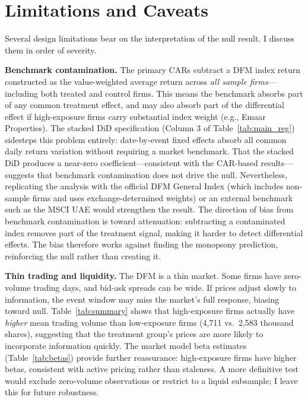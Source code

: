 \documentclass[12pt]{article}
\begin{document}

\section{Limitations and Caveats}\label{sec:limitations}

Several design limitations bear on the interpretation of the null result. I discuss them in order of severity.

\textbf{Benchmark contamination.} The primary CARs subtract a DFM index return constructed as the value-weighted average return across \emph{all sample firms}---including both treated and control firms. This means the benchmark absorbs part of any common treatment effect, and may also absorb part of the differential effect if high-exposure firms carry substantial index weight (e.g., Emaar Properties). The stacked DiD specification (Column 3 of Table~\ref{tab:main_reg}) sidesteps this problem entirely: date-by-event fixed effects absorb all common daily return variation without requiring a market benchmark. That the stacked DiD produces a near-zero coefficient---consistent with the CAR-based results---suggests that benchmark contamination does not drive the null. Nevertheless, replicating the analysis with the official DFM General Index (which includes non-sample firms and uses exchange-determined weights) or an external benchmark such as the MSCI UAE would strengthen the result. The direction of bias from benchmark contamination is toward attenuation: subtracting a contaminated index removes part of the treatment signal, making it harder to detect differential effects. The bias therefore works against finding the monopsony prediction, reinforcing the null rather than creating it.

\textbf{Thin trading and liquidity.} The DFM is a thin market. Some firms have zero-volume trading days, and bid-ask spreads can be wide. If prices adjust slowly to information, the event window may miss the market's full response, biasing toward null. Table~\ref{tab:summary} shows that high-exposure firms actually have \emph{higher} mean trading volume than low-exposure firms (4,711 vs.\ 2,583 thousand shares), suggesting that the treatment group's prices are more likely to incorporate information quickly. The market model beta estimates (Table~\ref{tab:betas}) provide further reassurance: high-exposure firms have higher betas, consistent with active pricing rather than staleness. A more definitive test would exclude zero-volume observations or restrict to a liquid subsample; I leave this for future robustness.
\end{document}
